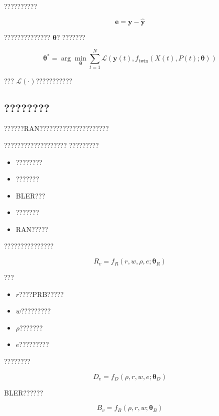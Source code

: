 ??????????

\begin{equation}
\boldsymbol{e}
=
\boldsymbol{y}
-
\hat{\boldsymbol{y}}
\end{equation}


??????????????
$\boldsymbol{\theta}$?
???????

\begin{equation}
\boldsymbol{\theta}^{*}
=
\arg\min_{\boldsymbol{\theta}}
\sum_{t=1}^{N}
\mathcal{L}
\left(
\boldsymbol{y}(t),
f_{\mathrm{twin}}
(
X(t),P(t);
\boldsymbol{\theta}
)
\right)
\end{equation}

???
$\mathcal{L}(\cdot)$???????????


\subsection*{????????}

??????RAN?????????????????????

???????????????????
?????????

\begin{itemize}
    \item ????????
    \item ???????
    \item BLER???
    \item ???????
    \item RAN?????
\end{itemize}


???????????????

\begin{equation}
R_v
=
f_R
(
r,w,\rho,e;
\boldsymbol{\theta}_R
)
\end{equation}

???

\begin{itemize}
    \item $r$????PRB?????
    \item $w$?????????
    \item $\rho$???????
    \item $e$?????????
\end{itemize}


????????

\begin{equation}
D_v
=
f_D
(
\rho,r,w,e;
\boldsymbol{\theta}_D
)
\end{equation}


BLER??????

\begin{equation}
B_v
=
f_B
(
\rho,r,w;
\boldsymbol{\theta}_B
)
\end{equation}


